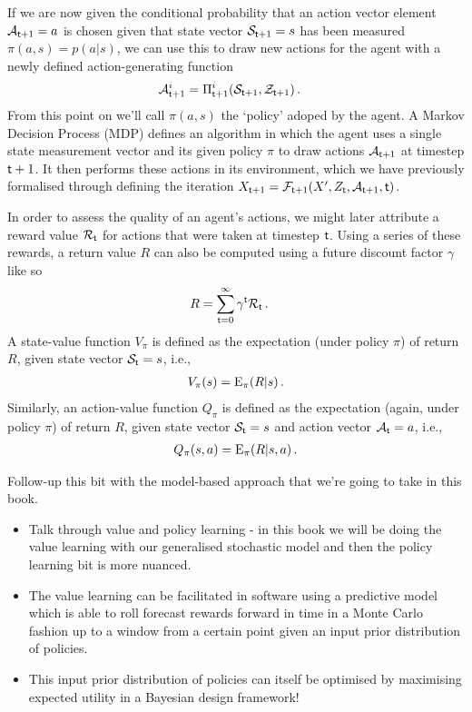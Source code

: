If we are now given the conditional probability that an action vector element ${\cal A}_{{\sf t}+1}=a$ is chosen given that state vector ${\cal S}_{{\sf t}+1}=s$ has been measured $\pi (a,s) = p(a\vert s)$, we can use this to draw new actions for the agent with a newly defined action-generating function
\begin{align}
{\cal A}_{{\sf t}+1}^i &= \Pi_{{\sf t}+1}^i({\cal S}_{{\sf t}+1}, {\cal Z}_{{\sf t}+1}) \label{eq:action-generating-function} \,.
\end{align}
From this point on we'll call $\pi (a,s)$ the `policy' adoped by the agent. A Markov Decision Process (MDP) defines an algorithm in which the agent uses a single state measurement vector and its given policy $\pi$ to draw actions ${\cal A}_{{\sf t}+1}$ at timestep ${{\sf t}+1}$. It then performs these actions in its environment, which we have previously formalised through defining the iteration $X_{{\sf t}+1} = {\cal F}_{{\sf t}+1}(X',Z_{\sf t},{\cal A}_{{\sf t}+1},{\sf t})$. 

In order to assess the quality of an agent's actions, we might later attribute a reward value ${\cal R}_{{\sf t}}$ for actions that were taken at timestep ${\sf t}$. Using a series of these rewards, a return value $R$ can also be computed using a future discount factor $\gamma$ like so 
\begin{align}
R &= \sum_{{\sf t}=0}^\infty \gamma^{\sf t}{\cal R}_{\sf t} \,.
\end{align}
A state-value function $V_\pi$ is defined as the expectation (under policy $\pi$) of return $R$, given state vector ${\cal S}_{\sf t}=s$, i.e.,
\begin{align}
V_\pi (s) = {\rm E}_\pi (R\vert s) \,.
\end{align}
Similarly, an action-value function $Q_\pi$ is defined as the expectation (again, under policy $\pi$) of return $R$, given state vector ${\cal S}_{\sf t}=s$ and action vector ${\cal A}_{\sf t}=a$, i.e.,
\begin{align}
Q_\pi (s,a) = {\rm E}_\pi (R\vert s,a) \,.
\end{align}

Follow-up this bit with the model-based approach that we're going to take in this book.
\begin{itemize}
\item{Talk through value and policy learning - in this book we will be doing the value learning with our generalised stochastic model and then the policy learning bit is more nuanced.}
\item{The value learning can be facilitated in software using a predictive model which is able to roll forecast rewards forward in time in a Monte Carlo fashion up to a window from a certain point given an input prior distribution of policies.}
\item{This input prior distribution of policies can itself be optimised by maximising expected utility in a Bayesian design framework!}
\end{itemize}
